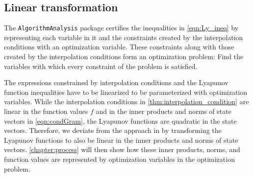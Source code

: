\subsection*{Linear transformation}

The \texttt{AlgorithmAnalysis} package certifies the inequalities in \eqref{eqn:Ly_ineq} by representing each variable in it and the constraints created by the interpolation conditions with an optimization variable. These constraints along with those created by the interpolation conditions form an optimization problem: Find the variables with which every constraint of the problem is satisfied.

The expressions constrained by interpolation conditions and the Lyapunov function inequalities have to be linearized to be parameterized with optimization variables. While the interpolation conditions in \cref{thm:interpolation_condition} are linear in the function values $f$ and in the inner products and norms of state vectors in \eqref{eqn:condGram}, the Lyapunov functions are quadratic in the state vectors. Therefore, we deviate from the approach in \cite{tutorial} by transforming the Lyapunov functions to also be linear in the inner products and norms of state vectors. \cref{chapter:process} will then show how these inner products, norms, and function values are represented by optimization variables in the optimization problem.

